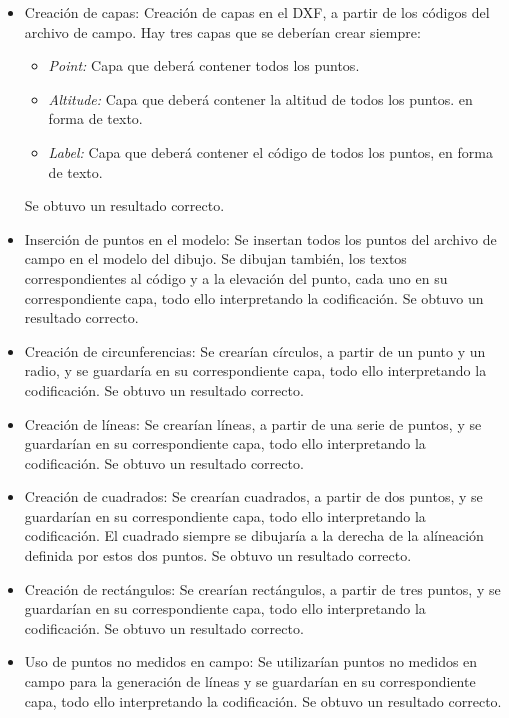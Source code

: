 \begin{itemize}
\item Creación de capas: Creación de capas en el DXF, a partir de los códigos del archivo de campo. Hay tres capas que se deberían crear siempre:
\begin{itemize}
	\item \emph{Point:} Capa que deberá contener todos los puntos.
 	\item \emph{Altitude:} Capa que deberá contener la altitud de todos los puntos. 	en forma de texto.
 	\item \emph{Label:}  Capa que deberá contener el código de todos los puntos, en 	forma de texto.
\end{itemize}
Se obtuvo un resultado correcto.

\item Inserción de puntos en el modelo: Se insertan todos los puntos del archivo de campo en el modelo del dibujo. Se dibujan también, los textos correspondientes al código y a la elevación del punto, cada uno en su correspondiente capa, todo ello interpretando la codificación. Se obtuvo un resultado correcto.

\item Creación de circunferencias: Se crearían círculos, a partir de un punto y un radio, y se guardaría en su correspondiente capa, todo ello interpretando la codificación. Se obtuvo un resultado correcto.  

\item Creación de líneas: Se crearían líneas, a partir de una serie de puntos, y se guardarían en su correspondiente capa, todo ello interpretando la codificación. Se obtuvo un resultado correcto. 

\item Creación de cuadrados: Se crearían cuadrados, a partir de dos puntos, y se guardarían en su correspondiente capa, todo ello interpretando la codificación. El cuadrado siempre se dibujaría a la derecha de la alíneación definida por estos dos puntos. Se obtuvo un resultado correcto.   

\item Creación de rectángulos: Se crearían rectángulos, a partir de tres puntos, y se guardarían en su correspondiente capa, todo ello interpretando la codificación. Se obtuvo un resultado correcto.   

\item Uso de puntos no medidos en campo: Se utilizarían puntos no medidos en campo para la generación de líneas y se guardarían en su correspondiente capa, todo ello interpretando la codificación. Se obtuvo un resultado correcto.
\end{itemize}


